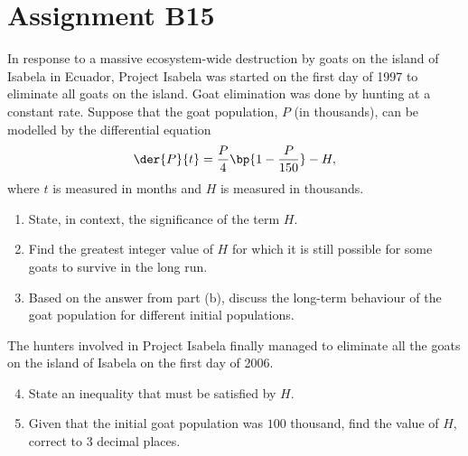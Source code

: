 \section{Assignment B15}

\begin{problem}
    In response to a massive ecosystem-wide destruction by goats on the island of Isabela in Ecuador, Project Isabela was started on the first day of 1997 to eliminate all goats on the island. Goat elimination was done by hunting at a constant rate. Suppose that the goat population, $P$ (in thousands), can be modelled by the differential equation \[\der{P}{t} = \frac{P}{4} \bp{1 - \frac{P}{150}} - H,\] where $t$ is measured in months and $H$ is measured in thousands.
    \begin{enumerate}
        \item State, in context, the significance of the term $H$.
        \item Find the greatest integer value of $H$ for which it is still possible for some goats to survive in the long run.
        \item Based on the answer from part (b), discuss the long-term behaviour of the goat population for different initial populations.
    \end{enumerate}
    The hunters involved in Project Isabela finally managed to eliminate all the goats on the island of Isabela on the first day of 2006.
    \begin{enumerate}
        \setcounter{enumi}{3}
        \item State an inequality that must be satisfied by $H$.
        \item Given that the initial goat population was $100$ thousand, find the value of $H$, correct to 3 decimal places.
    \end{enumerate}
\end{problem}
